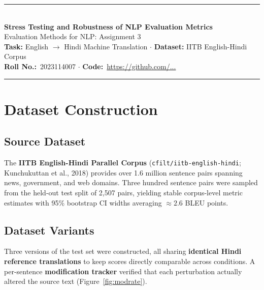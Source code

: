 \documentclass[11pt,a4paper]{article}
\begin{document}
\thispagestyle{empty}

\begin{center}
  {\color{hblue}\rule{\linewidth}{1.8pt}}\\[7pt]
  {\LARGE\bfseries\color{hblue}
    Stress Testing and Robustness of NLP Evaluation Metrics}\\[5pt]
  {\large Evaluation Methods for NLP: Assignment 3}\\[5pt]
  {\normalsize
    \textbf{Task:} English $\to$ Hindi Machine Translation
    \quad$\cdot$\quad
    \textbf{Dataset:} IITB English-Hindi Corpus}\\[3pt]
  {\small
    \textbf{Roll No.:}~2023114007
    \quad$\cdot$\quad
    \textbf{Code:}~\url{https://github.com/...}}\\[7pt]
  {\color{hblue!40}\rule{\linewidth}{0.6pt}}
\end{center}
\vspace{3pt}

\section{Dataset Construction}

\subsection{Source Dataset}

The \textbf{IITB English-Hindi Parallel Corpus}
(\texttt{cfilt/iitb-english-hindi}; Kunchukuttan et al., 2018) provides
over 1.6 million sentence pairs spanning news, government, and web domains.
Three hundred sentence pairs were sampled from the held-out test split of
2,507 pairs, yielding stable corpus-level metric estimates with 95\%
bootstrap CI widths averaging $\approx 2.6$ BLEU points.

\subsection{Dataset Variants}

Three versions of the test set were constructed, all sharing \textbf{identical
Hindi reference translations} to keep scores directly comparable across
conditions. A per-sentence \textbf{modification tracker} verified that each
perturbation actually altered the source text (Figure~\ref{fig:modrate}).
\end{document}
